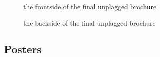 \begin{figure}[!h]
  \centering
  \caption{the frontside of the final unplagged brochure}
  \label{fig:brochure_final_frontside}
\end{figure}

\begin{figure}[!h]
  \centering
  \caption{the backside of the final unplagged brochure}
  \label{fig:brochure_final_backside}
\end{figure}

\pagebreak 

\subsection{Posters}

